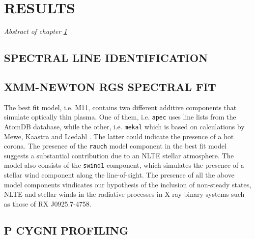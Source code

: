 \def\baselinestretch{1}
\chapter{RESULTS} \label{chap:results}
    \minitoc
    \emph{Abstract of chapter \ref{chap:results}}
    
    \section{SPECTRAL LINE IDENTIFICATION}
    
    \section{XMM-NEWTON RGS SPECTRAL FIT}
    The best fit model, i.e. M11, contains two different additive components that simulate optically thin plasma. One of them, i.e. \texttt{apec} uses line lists from the AtomDB database, while the other, i.e. \texttt{mekal} which is based on calculations by Mewe, Kaastra and Liedahl \cite{meka,liedahl}. The latter could indicate the presence of a hot corona. The presence of the \texttt{rauch} model component in the best fit model suggests a substantial contribution due to an NLTE stellar atmosphere. The model also consists of the \texttt{swind1} component, which simulates the presence of a stellar wind component along the line-of-sight. The presence of all the above model components vindicates our hypothesis of the inclusion of non-steady states, NLTE and stellar winds in the radiative processes in X-ray binary systems such as those of RX J0925.7-4758.
    
    \section{P CYGNI PROFILING}